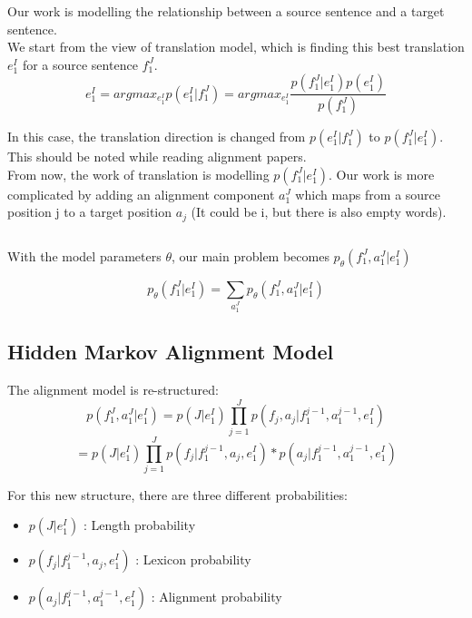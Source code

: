 \documentclass{article}
\begin{document}
Our work is modelling the relationship between a source sentence and a target sentence. \\
We start from the view of translation model, which is finding this best translation $e_1^I$ for a source sentence $f_1^J$.
\begin{equation}
e_1^I = argmax_{e_1^I} p(e_1^I|f_1^J) = argmax_{e_1^I} \frac{p(f_1^J|e_1^I)p(e_1^I)}{p(f_1^J)}
\end{equation}

In this case, the translation direction is changed from $p(e_1^I|f_1^J)$ to $p(f_1^J|e_1^I)$. This should be noted while reading alignment papers. \\

From now, the work of translation is modelling $p(f_1^J|e_1^I)$. Our work is more complicated by adding an alignment component $a_1^J$ which maps from a source position j to a target position $a_j$ (It could be i, but there is also empty words).

\begin{equation}
\end{equation}

With the model parameters $\theta$, our main problem becomes $p_{\theta}(f_1^J, a_1^J|e_1^I)$

\begin{equation}
p_{\theta}(f_1^J|e_1^I) = \sum_{a_1^J} p_{\theta}(f_1^J, a_1^J|e_1^I)
\label{Overview about Statistical Alignment p(f,e)}
\end{equation}


\subsection{Hidden Markov Alignment Model \cite{Och2003Systematic}}
The alignment model is re-structured:
\begin{equation}
p(f_1^J, a_1^J|e_1^I) = p(J|e_1^I) \prod_{j=1}^J p(f_j, a_j | f_1^{j-1}, a_1^{j-1}, e_1^I)
\end{equation}
\begin{equation}
= p(J|e_1^I) \prod_{j=1}^J p( f_j | f_1^{j-1}, a_j, e_1^I) * p( a_j | f_1^{j-1}, a_1^{j-1}, e_1^I)
\end{equation}

For this new structure, there are three different probabilities:
\begin{itemize}
\item $p(J|e_1^I)$ : Length probability
\item $p( f_j | f_1^{j-1}, a_j, e_1^I)$ : Lexicon  probability
\item $p( a_j | f_1^{j-1}, a_1^{j-1}, e_1^I)$ : Alignment probability
\end{itemize}
\end{document}
